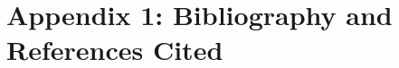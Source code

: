\documentclass[11pt]{article} \usepackage[margin=1in]{geometry}
\begin{document}

\clearpage \appendix \section*{Appendix 1: Bibliography and References Cited}
\nocite{dakota_docs}
\nocite{romtools_workflows}


\end{document}

